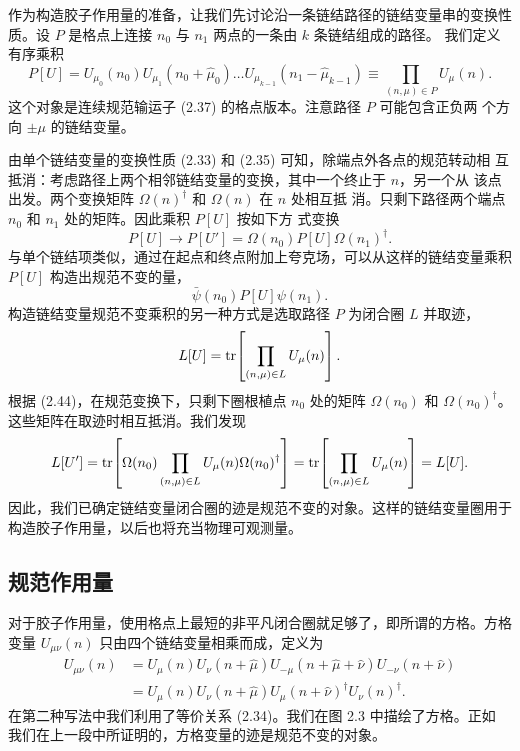 作为构造胶子作用量的准备，让我们先讨论沿一条链结路径的链结变量串的变换性
质。设 $P$ 是格点上连接 $n_0$ 与 $n_1$ 两点的一条由 $k$ 条链结组成的路径。
我们定义有序乘积
\begin{equation}
  P[U] = U_{\mu_0}(n_0) U_{\mu_1}(n_0 + \hat\mu_0) \ldots
    U_{\mu_{k-1}}(n_1 - \hat\mu_{k-1})
  \equiv \prod_{(n,\mu)\in P} U_\mu(n) .
\end{equation}
这个对象是连续规范输运子 (2.37) 的格点版本。注意路径 $P$ 可能包含正负两
个方向 $\pm\mu$ 的链结变量。

由单个链结变量的变换性质 (2.33) 和 (2.35) 可知，除端点外各点的规范转动相
互抵消：考虑路径上两个相邻链结变量的变换，其中一个终止于 $n$，另一个从
该点出发。两个变换矩阵 $\Omega(n)^\dagger$ 和 $\Omega(n)$ 在 $n$ 处相互抵
消。只剩下路径两个端点 $n_0$ 和 $n_1$ 处的矩阵。因此乘积 $P[U]$ 按如下方
式变换
\begin{equation}
  P[U] \to P[U'] = \Omega(n_0) P[U] \Omega(n_1)^\dagger .
\end{equation}
与单个链结项类似，通过在起点和终点附加上夸克场，可以从这样的链结变量乘积
$P[U]$ 构造出规范不变的量，
\begin{equation}
  \bar\psi(n_0) P[U] \psi(n_1) .
\end{equation}
构造链结变量规范不变乘积的另一种方式是选取路径 $P$ 为闭合圈 $L$ 并取迹，
\begin{equation}
  L[U] = \operatorname{tr}\!\left[ \prod_{(n,\mu)\in L} U_\mu(n) \right] .
\end{equation}
根据 (2.44)，在规范变换下，只剩下圈根植点 $n_0$ 处的矩阵 $\Omega(n_0)$ 和
$\Omega(n_0)^\dagger$。这些矩阵在取迹时相互抵消。我们发现
\begin{equation}
  L[U'] = \operatorname{tr}\!\left[ \Omega(n_0) \prod_{(n,\mu)\in L} U_\mu(n)
    \Omega(n_0)^\dagger \right] = \operatorname{tr}\!\left[ \prod_{(n,\mu)\in L} U_\mu(n)
    \right] = L[U] .
\end{equation}
因此，我们已确定链结变量闭合圈的迹是规范不变的对象。这样的链结变量圈用于
构造胶子作用量，以后也将充当物理可观测量。

\subsection{规范作用量}

对于胶子作用量，使用格点上最短的非平凡闭合圈就足够了，即所谓的方格。方格
变量 $U_{\mu\nu}(n)$ 只由四个链结变量相乘而成，定义为
\begin{equation}
  \begin{split}
    U_{\mu\nu}(n) &= U_\mu(n) U_\nu(n + \hat\mu) U_{-\mu}(n + \hat\mu + \hat\nu)
      U_{-\nu}(n + \hat\nu)\\
    &= U_\mu(n) U_\nu(n + \hat\mu) U_\mu(n + \hat\nu)^\dagger U_\nu(n)^\dagger .
  \end{split}
\end{equation}
在第二种写法中我们利用了等价关系 (2.34)。我们在图 2.3 中描绘了方格。正如
我们在上一段中所证明的，方格变量的迹是规范不变的对象。

